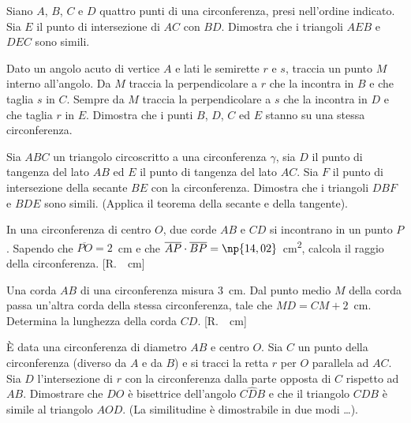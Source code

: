 \begin{esercizio}
\label{ese:6.101}
Siano $A$, $B$, $C$ e $D$ quattro punti di una circonferenza, presi nell'ordine indicato. Sia $E$ il punto di intersezione di $AC$ con $BD$. Dimostra che i triangoli $AEB$ e $DEC$ sono simili.
\end{esercizio}

\begin{esercizio}
\label{ese:6.102}
Dato un angolo acuto di vertice $A$ e lati le semirette $r$ e $s$, traccia un punto $M$ interno all'angolo. Da $M$ traccia la perpendicolare a $r$ che la incontra in $B$ e che taglia $s$ in $C$. Sempre da $M$ traccia la perpendicolare a $s$ che la incontra in $D$ e che taglia $r$ in $E$. Dimostra che i punti $B$, $D$, $C$ ed $E$ stanno su una stessa circonferenza. 
\end{esercizio}

\begin{esercizio}
\label{ese:6.103}
Sia $ABC$ un triangolo circoscritto a una circonferenza $\gamma$, sia $D$ il punto di tangenza del lato $AB$ ed $E$ il punto di tangenza del lato $AC$. Sia $F$ il punto di intersezione della secante $BE$ con la circonferenza. Dimostra che i triangoli $DBF$ e $BDE$ sono simili. (Applica il teorema della secante e della tangente).
\end{esercizio}

\begin{esercizio}
\label{ese:6.104}
In una circonferenza di centro $O$, due corde $AB$ e $CD$ si incontrano in un punto $P$. Sapendo che $\overline{PO}=2$~cm e che $\overline{AP}\cdot \overline{BP}=\np{14,02}$~cm\textsuperscript{2}, calcola il raggio della circonferenza. [R.~~cm]
\end{esercizio}

\begin{esercizio}
\label{ese:6.105}
Una corda $AB$ di una circonferenza misura 3~cm. Dal punto medio $M$ della corda passa un'altra corda della stessa circonferenza, tale che $MD=CM+2$~cm. Determina la lunghezza della corda $CD$. [R.~~cm]
\end{esercizio}

\begin{esercizio}
\label{ese:6.106}
\`E data una circonferenza di diametro $AB$ e centro $O$. Sia $C$ un punto della circonferenza (diverso da $A$ e da $B$) e si tracci la retta $r$ per $O$ parallela ad $AC$. Sia $D$ l'intersezione di $r$ con la circonferenza dalla parte opposta di $C$ rispetto ad $AB$. Dimostrare che $DO$ è bisettrice dell'angolo $C\widehat{D}B$ e che il triangolo $CDB$ è simile al triangolo $AOD$. (La similitudine è dimostrabile in due modi \ldots{}).
\end{esercizio}

